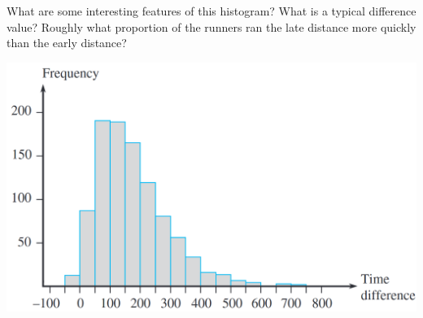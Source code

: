\documentclass[letterpaper,12pt]{article}
\begin{document}
\begin{enumerate}
    What are some interesting features of this histogram? What is a typical difference value? Roughly what proportion of the runners ran the late distance more quickly than the early distance?

    \begin{center}
      \includegraphics[scale=0.3]{../resources/01_02_22_01.png}
    \end{center}
\end{enumerate}
\end{document}

